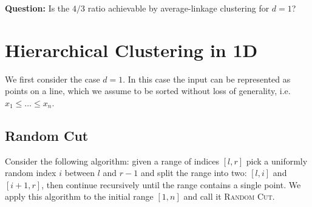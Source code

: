 \documentclass{article}
\begin{document}
\textbf{Question:} Is the $4/3$ ratio achievable by average-linkage clustering for $d = 1$?


\section{Hierarchical Clustering in 1D}
We first consider the case $d = 1$.
In this case the input can be represented as points on a line, which we assume to be sorted without loss of generality, i.e. $x_1 \le \dots  \le x_n$.



\newcommand{\cblue}{\mathcal T^*_{blue}}
\newcommand{\cred}{\mathcal T^*_{red}}
\newcommand{\copt}{\mathcal T^*}
\newcommand{\cprime}{\mathcal T'^*}
\newcommand{\tblue}{T^*_{blue}}
\newcommand{\tred}{T^*_{red}}
\newcommand{\topt}{T^*}
\newcommand{\tprime}{T'^*}


\subsection{Random Cut}
Consider the following algorithm: given a range of indices $[l,r]$ pick a uniformly random index $i$ between $l$ and $r - 1$ and split the range into two: $[l, i]$ and $[i + 1, r]$, then continue recursively until the range contains a single point.
We apply this algorithm to the initial range $[1,n]$ and call it \textsc{Random Cut}.
\end{document}
